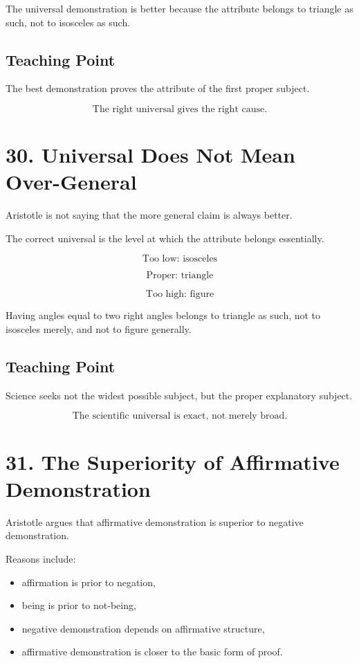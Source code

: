 \documentclass[12pt]{article}
\begin{document}
The universal demonstration is better because the attribute belongs to triangle
as such, not to isosceles as such.

\subsection*{Teaching Point}

The best demonstration proves the attribute of the first proper subject.

\[
\boxed{
\text{The right universal gives the right cause.}
}
\]

\section*{30. Universal Does Not Mean Over-General}

Aristotle is not saying that the more general claim is always better.

The correct universal is the level at which the attribute belongs essentially.

\[
\text{Too low: isosceles}
\]

\[
\text{Proper: triangle}
\]

\[
\text{Too high: figure}
\]

Having angles equal to two right angles belongs to triangle as such, not to
isosceles merely, and not to figure generally.

\subsection*{Teaching Point}

Science seeks not the widest possible subject, but the proper explanatory
subject.

\[
\boxed{
\text{The scientific universal is exact, not merely broad.}
}
\]

\section*{31. The Superiority of Affirmative Demonstration}

Aristotle argues that affirmative demonstration is superior to negative
demonstration.

Reasons include:

\begin{itemize}[itemsep=0.25em]
    \item affirmation is prior to negation,
    \item being is prior to not-being,
    \item negative demonstration depends on affirmative structure,
    \item affirmative demonstration is closer to the basic form of proof.
\end{itemize}
\end{document}
